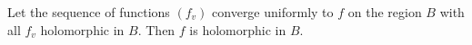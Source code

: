 Let the sequence of functions $(f_v)$ converge uniformly to $f$ on the region $B$ with all $f_v$ holomorphic in $B$. Then $f$ is holomorphic in $B$.
